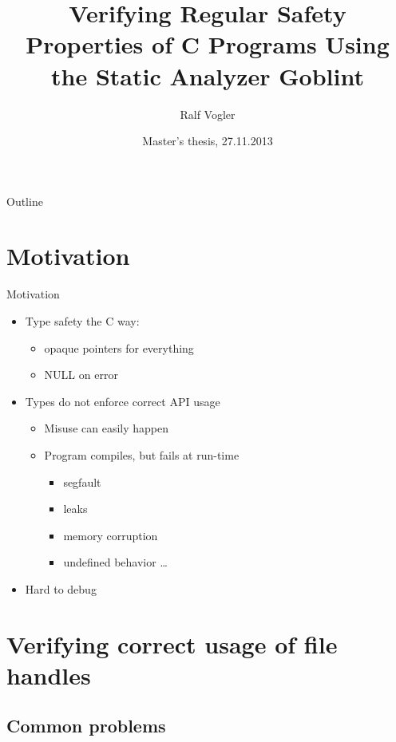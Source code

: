 \documentclass{beamer}
\title{Verifying Regular Safety Properties of C Programs Using the Static Analyzer Goblint}
\author{Ralf Vogler}
\institute[TUM] %
{
  Department of Computer Science\\
  Technische Universit\"at M\"unchen}
\date{Master's thesis, 27.11.2013}
\begin{document}
\begin{frame}
  \titlepage
\end{frame}

\begin{frame}{Outline}
  \tableofcontents
\end{frame}


\section{Motivation}

\begin{frame}{Motivation}
\begin{itemize}
\item Type safety the C way:
	\begin{itemize}
	\item opaque pointers for everything
	\item NULL on error
	\end{itemize} \pause
\item Types do not enforce correct API usage
	\begin{itemize}
	\item Misuse can easily happen
	\item Program compiles, but fails at run-time
		\begin{itemize}
		\item segfault
		\item leaks
		\item memory corruption
		\item undefined behavior \ldots
		\end{itemize}
	\end{itemize} \pause
	\item Hard to debug
\end{itemize}
\end{frame}


\section{Verifying correct usage of file handles}

\subsection{Common problems}
\end{document}
